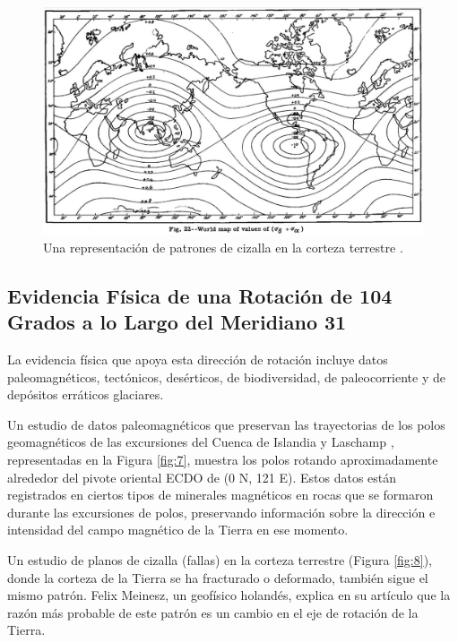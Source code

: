 \documentclass[10pt,twocolumn,letterpaper]{article}
\begin{document}
\begin{figure}[t]
\begin{center}
   \includegraphics[width=1\linewidth]{meinesz3.jpg}
\end{center}
   \caption{Una representación de patrones de cizalla en la corteza terrestre \cite{36}.}
\label{fig:8}
\label{fig:onecol}
\end{figure}

\subsection{Evidencia Física de una Rotación de 104 Grados a lo Largo del Meridiano 31}

La evidencia física que apoya esta dirección de rotación incluye datos paleomagnéticos, tectónicos, desérticos, de biodiversidad, de paleocorriente y de depósitos erráticos glaciares.

Un estudio de datos paleomagnéticos que preservan las trayectorias de los polos geomagnéticos de las excursiones del Cuenca de Islandia y Laschamp \cite{35}, representadas en la Figura \ref{fig:7}, muestra los polos rotando aproximadamente alrededor del pivote oriental ECDO de (0 N, 121 E). Estos datos están registrados en ciertos tipos de minerales magnéticos en rocas que se formaron durante las excursiones de polos, preservando información sobre la dirección e intensidad del campo magnético de la Tierra en ese momento.

Un estudio de planos de cizalla (fallas) en la corteza terrestre (Figura \ref{fig:8}), donde la corteza de la Tierra se ha fracturado o deformado, también sigue el mismo patrón. Felix Meinesz, un geofísico holandés, explica en su artículo \cite{36} que la razón más probable de este patrón es un cambio en el eje de rotación de la Tierra.
\end{document}
